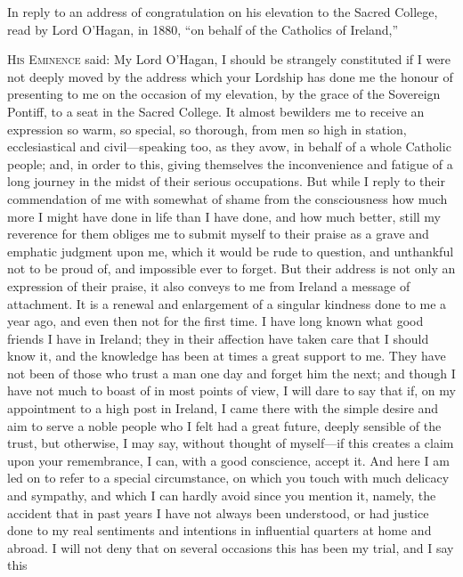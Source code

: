 
In reply to an address of
congratulation on his elevation to the Sacred College, read by Lord O'Hagan,
in 1880, ``on behalf of the Catholics of Ireland,''

H\textsc{is} E\textsc{minence}
said: My Lord O'Hagan, I should be strangely constituted if I were not
deeply moved by the address which your Lordship has done me the honour
of presenting to me on the occasion of my elevation, by the grace of
the Sovereign Pontiff, to a seat in the Sacred College. It almost
bewilders me to receive an expression so warm, so special, so
thorough, from men so high in station, ecclesiastical and
civil—speaking too, as they avow, in behalf of a whole Catholic
people; and, in order to this, giving themselves the inconvenience and
fatigue of a long journey in the midst of their serious occupations.
But while I reply to their commendation of me with somewhat of shame
from the consciousness how much more I might have done in life than I
have done, and how much better, still my reverence for them obliges me
to submit myself to their praise as a grave and emphatic judgment upon
me, which it would be rude to question, and unthankful not to be proud
of, and impossible ever to forget. But their address is not only an
expression of their praise, it also conveys to me from Ireland a
message of attachment. It is a renewal and enlargement of a singular
kindness done to me a year ago, and even then not for the first time.
I have long known what good friends I have in Ireland; they in their
affection have taken care that I should know it, and the knowledge has
been at times a great support to me. They have not been of those who
trust a man one day and forget him the next; and though I have not
much to boast of in most points of view, I will dare to say that if,
on my appointment to a high post in Ireland, I came there with the
simple desire and aim to serve a noble people who I felt had a great
future, deeply sensible of the trust, but otherwise, I may say,
without thought of myself—if this creates a claim upon your
remembrance, I can, with a good conscience, accept it. And here I am
led on to refer to a special circumstance, on which you touch with
much delicacy and sympathy, and which I can hardly avoid since you
mention it, namely, the accident that in past years I have not always
been understood, or had justice done to my real sentiments and intentions in influential quarters at home and abroad. I will not deny
that on several occasions this has been my trial, and I say this
